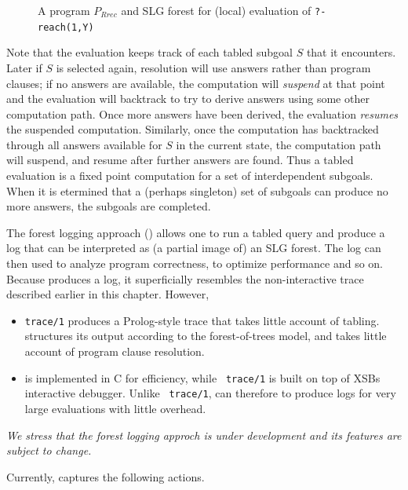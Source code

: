 \begin{example}
\begin{figure}[htbp]
\caption{A program $P_{Rrec}$ and SLG forest for (local) evaluation of
  {\tt ?- reach(1,Y)}} \label{fig:local}
\end{figure}
%
Note that the evaluation keeps track of each tabled subgoal $S$ that
it encounters.  Later if $S$ is selected again, resolution will use
answers rather than program clauses; if no answers are available, the
computation will {\em suspend} at that point and the evaluation will
backtrack to try to derive answers using some other computation path.
Once more answers have been derived, the evaluation {\em resumes} the
suspended computation.  Similarly, once the computation has
backtracked through all answers available for $S$ in the current
state, the computation path will suspend, and resume after further
answers are found.  Thus a tabled evaluation is a fixed point
computation for a set of interdependent subgoals.  When it is
etermined that a (perhaps singleton) set of subgoals can produce no
more answers, the subgoals are completed.
\end{example}


The forest logging approach ({\tt \ctrace}) allows one to run a tabled
query and produce a log that can be interpreted as (a partial image
of) an SLG forest.  The log can then used to analyze program
correctness, to optimize performance and so on.  Because \ctrace{}
  produces a log, it superficially resembles the non-interactive trace
  described earlier in this chapter.  However,
\begin{itemize}
\item {\tt trace/1} produces a Prolog-style trace that takes little
  account of tabling.  \ctrace{} structures its output according to
  the forest-of-trees model, and takes little account of program
  clause resolution.

\item \ctrace{} is implemented in C for efficiency, while {\tt
  trace/1} is built on top of XSBs interactive debugger.  Unlike {\tt
  trace/1}, \ctrace{} can therefore to produce logs for very large
  evaluations with little overhead.
\end{itemize}

{\em We stress that the forest logging approch is under development and
  its features are subject to change.}

Currently, \ctrace{} captures the following actions.

